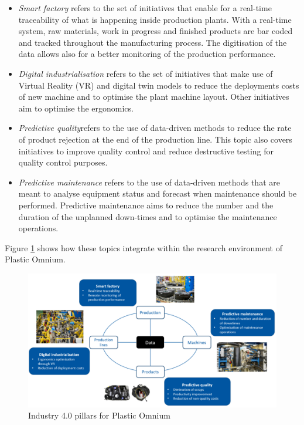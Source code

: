 \begin{itemize}
    \item \textit{Smart factory} refers to the set of initiatives that enable for a real-time traceability of what is happening inside production plants. With a real-time system, raw materials, work in progress and finished products are bar coded and tracked throughout the manufacturing process. The digitisation of the data allows also for a better monitoring of the production performance.
    \item \textit{Digital industrialisation} refers to the set of initiatives that make use of Virtual Reality (VR) and digital twin models to reduce the deployments costs of new machine and to optimise the plant machine layout. Other initiatives aim to optimise the ergonomics. 
    \item \textit{Predictive quality}refers to the use of data-driven methods to reduce the rate of product rejection at the end of the production line. This topic also covers initiatives to improve quality control and reduce destructive testing for quality control purposes.  
    \item \textit{Predictive maintenance} refers to the use of data-driven methods that are meant to analyse equipment status and forecast when maintenance should be performed. Predictive maintenance aims to reduce the number and the duration of the unplanned down-times and to optimise the maintenance operations.
\end{itemize}
%
Figure \ref{fig:pillars} shows how these topics integrate within the research environment of Plastic Omnium.
%
\begin{figure}
\centerline{\includegraphics[scale=0.50]{images/chapter_1/Digitalisation_pillars.png}}
\caption{Industry 4.0 pillars for Plastic Omnium}
\label{fig:pillars}
\end{figure}
